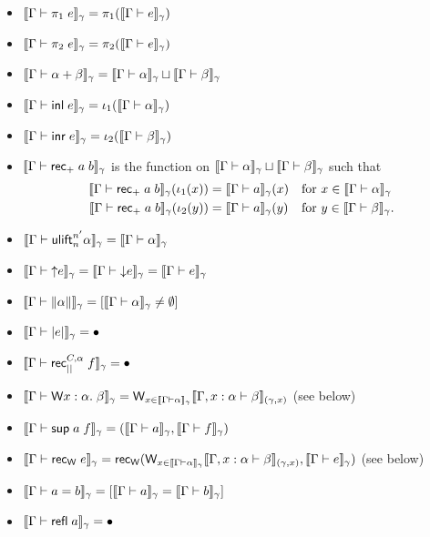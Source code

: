 \begin{itemize}
\item $\scott{\Gamma\vdash\pi_1\;e}_\gamma=\pi_1(\scott{\Gamma\vdash e}_\gamma)$
\item $\scott{\Gamma\vdash\pi_2\;e}_\gamma=\pi_2(\scott{\Gamma\vdash e}_\gamma)$
\item $\scott{\Gamma\vdash\alpha+\beta}_\gamma=\scott{\Gamma\vdash\alpha}_\gamma\sqcup\scott{\Gamma\vdash\beta}_\gamma$
\item $\scott{\Gamma\vdash\inl e}_\gamma=\iota_1(\scott{\Gamma\vdash\alpha}_\gamma)$
\item $\scott{\Gamma\vdash\inr e}_\gamma=\iota_2(\scott{\Gamma\vdash\beta}_\gamma)$
\item $\scott{\Gamma\vdash\rec_+\;a\;b}_\gamma$ is the function on $\scott{\Gamma\vdash\alpha}_\gamma\sqcup\scott{\Gamma\vdash\beta}_\gamma$ such that
\begin{align*}
\scott{\Gamma\vdash\rec_+\;a\;b}_\gamma(\iota_1(x))&=\scott{\Gamma\vdash a}_\gamma(x)&&\mbox{for }x\in \scott{\Gamma\vdash\alpha}_\gamma\\
\scott{\Gamma\vdash\rec_+\;a\;b}_\gamma(\iota_2(y))&=\scott{\Gamma\vdash a}_\gamma(y)&&\mbox{for }y\in \scott{\Gamma\vdash\beta}_\gamma.
\end{align*}
\item $\scott{\Gamma\vdash\ulift_n^{n'} \alpha}_\gamma=\scott{\Gamma\vdash\alpha}_\gamma$
\item $\scott{\Gamma\vdash{\uparrow}e}_\gamma=\scott{\Gamma\vdash{\downarrow}e}_\gamma=\scott{\Gamma\vdash e}_\gamma$
\item $\scott{\Gamma\vdash\|\alpha\|}_\gamma=[\scott{\Gamma\vdash\alpha}_\gamma\ne \emptyset]$
\item $\scott{\Gamma\vdash|e|}_\gamma=\bullet$
\item $\scott{\Gamma\vdash\rec_{||}^{C,\alpha}\;f}_\gamma=\bullet$
\item $\scott{\Gamma\vdash\W x:\alpha.\;\beta}_\gamma=\W_{x\in\scott{\Gamma\vdash\alpha}_\gamma}\scott{\Gamma,x:\alpha\vdash\beta}_{(\gamma,x)}$ (see below)
\item $\scott{\Gamma\vdash\sup a\;f}_\gamma=(\scott{\Gamma\vdash a}_\gamma,\scott{\Gamma\vdash f}_\gamma)$
\item $\scott{\Gamma\vdash\rec_\W\;e}_\gamma=\rec_\W(\W_{x\in\scott{\Gamma\vdash\alpha}_\gamma}\scott{\Gamma,x:\alpha\vdash\beta}_{(\gamma,x)},\scott{\Gamma\vdash e}_\gamma)$ (see below)
\item $\scott{\Gamma\vdash a=b}_\gamma=[\scott{\Gamma\vdash a}_\gamma=\scott{\Gamma\vdash b}_\gamma]$
\item $\scott{\Gamma\vdash \refl\;a}_\gamma=\bullet$

\end{itemize}
